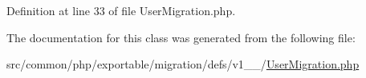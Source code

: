 Definition at line 33 of file User\+Migration.\+php.



The documentation for this class was generated from the following file\+:\begin{DoxyCompactItemize}
\item 
src/common/php/exportable/migration/defs/v1\+\_\+\_/\hyperlink{v1__0__0_2UserMigration_8php}{User\+Migration.\+php}\end{DoxyCompactItemize}
